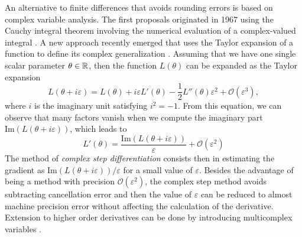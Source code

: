 An alternative to finite differences that avoids rounding errors is based on complex variable analysis. 
The first proposals originated in 1967 using the Cauchy integral theorem involving the numerical evaluation of a complex-valued integral \cite{Lyness_1967, Lyness_Moler_1967}.
A new approach recently emerged that uses the Taylor expansion of a function to define its complex generalization \cite{Squire_Trapp_1998_complex_diff, Martins_Sturdza_Alonso_2003_complex_differentiation}. 
Assuming that we have one single scalar parameter $\theta \in \operatorname{\mathbb{R}}$, then the function $L(\theta)$ can be expanded as 
the Taylor expansion
\begin{equation}
    L(\theta + i \varepsilon)
    = 
    L(\theta) + i \varepsilon L'(\theta) 
    - 
    \frac 1 2
    L''(\theta) \varepsilon^2
    + 
    \mathcal O (\varepsilon^3),
\end{equation}
where $i$ is the imaginary unit satisfying $i^2 = -1$. 
From this equation, we can observe that many factors vanish when we compute the imaginary part $\text{Im}(L(\theta + i \varepsilon))$, which leads to
\begin{equation}
    L'(\theta) 
    = 
    \frac{\text{Im}(L(\theta + i \varepsilon))}{\varepsilon}
    + 
    \mathcal{O} (\varepsilon^2)
\end{equation}
The method of \textit{complex step differentiation} consists then in estimating the gradient as $\text{Im}(L(\theta + i \varepsilon)) / \varepsilon$ for a small value of $\varepsilon$. 
Besides the advantage of being a method with precision $\mathcal{O}(\varepsilon^2)$, the complex step method avoids subtracting cancellation error and then the value of $\varepsilon$ can be reduced to almost machine precision error without affecting the calculation of the derivative. 
Extension to higher order derivatives can be done by introducing multicomplex variables \cite{Lantoine_Russell_Dargent_2012}. 